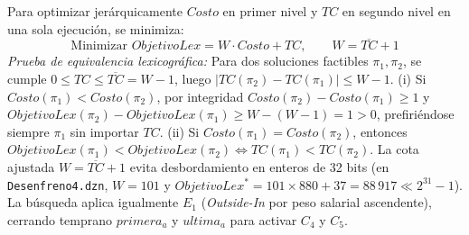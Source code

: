 Para optimizar jerárquicamente $Costo$ en primer nivel y $TC$ en segundo nivel en una sola ejecución, se minimiza:
\begin{equation}
    \text{Minimizar } ObjetivoLex = W \cdot Costo + TC, \qquad W = \overline{TC} + 1
    \label{eq:obj_lex}
\end{equation}
\emph{Prueba de equivalencia lexicográfica:} Para dos soluciones factibles $\pi_1, \pi_2$, se cumple $0 \le TC \le \overline{TC} = W - 1$, luego $|TC(\pi_2) - TC(\pi_1)| \le W - 1$. (i) Si $Costo(\pi_1) < Costo(\pi_2)$, por integridad $Costo(\pi_2) - Costo(\pi_1) \ge 1$ y $ObjetivoLex(\pi_2) - ObjetivoLex(\pi_1) \ge W - (W - 1) = 1 > 0$, prefiriéndose siempre $\pi_1$ sin importar $TC$. (ii) Si $Costo(\pi_1) = Costo(\pi_2)$, entonces $ObjetivoLex(\pi_1) < ObjetivoLex(\pi_2) \iff TC(\pi_1) < TC(\pi_2)$. La cota ajustada $W = \overline{TC} + 1$ evita desbordamiento en enteros de 32 bits (en \texttt{Desenfreno4.dzn}, $W = 101$ y $ObjetivoLex^* = 101 \times 880 + 37 = 88\,917 \ll 2^{31}-1$). La búsqueda aplica igualmente $E_1$ (\emph{Outside-In} por peso salarial ascendente), cerrando temprano $primera_a$ y $ultima_a$ para activar $C_4$ y $C_5$.
